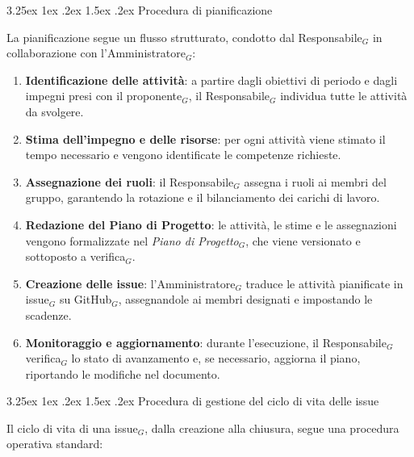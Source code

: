 \documentclass[a4paper, 10pt]{article}
\makeatletter
\renewcommand\paragraph{\@startsection{paragraph}{4}{\z@}%
  {3.25ex \@plus1ex \@minus .2ex}%
  {1.5ex \@plus .2ex}%
  {\normalfont\normalsize\bfseries}}
\makeatother
\begin{document}
\paragraph{Procedura di pianificazione}

La pianificazione segue un flusso strutturato, condotto dal Responsabile$_G$ in collaborazione con l'Amministratore$_G$:

\begin{enumerate}
    \item \textbf{Identificazione delle attività}: a partire dagli obiettivi di periodo e dagli impegni presi con il proponente$_G$, il Responsabile$_G$ individua tutte le attività da svolgere.
    \item \textbf{Stima dell'impegno e delle risorse}: per ogni attività viene stimato il tempo necessario e vengono identificate le competenze richieste.
    \item \textbf{Assegnazione dei ruoli}: il Responsabile$_G$ assegna i ruoli ai membri del gruppo, garantendo la rotazione e il bilanciamento dei carichi di lavoro.
    \item \textbf{Redazione del Piano di Progetto}: le attività, le stime e le assegnazioni vengono formalizzate nel \emph{Piano di Progetto}$_G$, che viene versionato e sottoposto a verifica$_G$.
    \item \textbf{Creazione delle issue}: l'Amministratore$_G$ traduce le attività pianificate in issue$_G$ su GitHub$_G$, assegnandole ai membri designati e impostando le scadenze.
    \item \textbf{Monitoraggio e aggiornamento}: durante l'esecuzione, il Responsabile$_G$ verifica$_G$ lo stato di avanzamento e, se necessario, aggiorna il piano, riportando le modifiche nel documento.
\end{enumerate}

\paragraph{Procedura di gestione del ciclo di vita delle issue}

Il ciclo di vita di una issue$_G$, dalla creazione alla chiusura, segue una procedura operativa standard:
\end{document}
